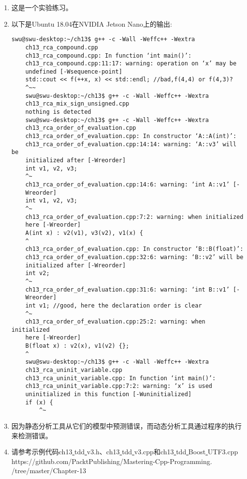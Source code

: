 \begin{enumerate}
	\item 这是一个实验练习。
	\item 以下是Ubuntu 18.04在NVIDIA Jetson Nano上的输出:
	\begin{lstlisting}[caption={}]
	swu@swu-desktop:~/ch13$ g++ -c -Wall -Weffc++ -Wextra
	ch13_rca_compound.cpp
	ch13_rca_compound.cpp: In function ‘int main()’:
	ch13_rca_compound.cpp:11:17: warning: operation on ‘x’ may be
	undefined [-Wsequence-point]
	std::cout << f(++x, x) << std::endl; //bad,f(4,4) or f(4,3)?
	^~~
	swu@swu-desktop:~/ch13$ g++ -c -Wall -Weffc++ -Wextra
	ch13_rca_mix_sign_unsigned.cpp
	nothing is detected
	swu@swu-desktop:~/ch13$ g++ -c -Wall -Weffc++ -Wextra
	ch13_rca_order_of_evaluation.cpp
	ch13_rca_order_of_evaluation.cpp: In constructor ‘A::A(int)’:
	ch13_rca_order_of_evaluation.cpp:14:14: warning: ‘A::v3’ will be
	initialized after [-Wreorder]
	int v1, v2, v3;
	^~
	ch13_rca_order_of_evaluation.cpp:14:6: warning: ‘int A::v1’ [-
	Wreorder]
	int v1, v2, v3;
	^~
	ch13_rca_order_of_evaluation.cpp:7:2: warning: when initialized
	here [-Wreorder]
	A(int x) : v2(v1), v3(v2), v1(x) {
	^
	ch13_rca_order_of_evaluation.cpp: In constructor ‘B::B(float)’:
	ch13_rca_order_of_evaluation.cpp:32:6: warning: ‘B::v2’ will be
	initialized after [-Wreorder]
	int v2;
	^~
	ch13_rca_order_of_evaluation.cpp:31:6: warning: ‘int B::v1’ [-
	Wreorder]
	int v1; //good, here the declaration order is clear
	^~
	ch13_rca_order_of_evaluation.cpp:25:2: warning: when initialized
	here [-Wreorder]
	B(float x) : v2(x), v1(v2) {};
	^
	swu@swu-desktop:~/ch13$ g++ -c -Wall -Weffc++ -Wextra
	ch13_rca_uninit_variable.cpp
	ch13_rca_uninit_variable.cpp: In function ‘int main()’:
	ch13_rca_uninit_variable.cpp:7:2: warning: ‘x’ is used
	uninitialized in this function [-Wuninitialized]
	if (x) {
		^~
	\end{lstlisting}
	\item 因为静态分析工具从它们的模型中预测错误，而动态分析工具通过程序的执行来检测错误。
	\item 请参考示例代码ch13\underline{ }tdd\underline{ }v3.h、ch13\underline{ }tdd\underline{ }v3.cpp和ch13\underline{ }tdd\underline{ }Boost\underline{ }UTF3.cpp
	\\https:/​/github.com/​PacktPublishing/​Mastering-Cpp-Programming.​/tree/master/Chapter-​13
\end{enumerate}












